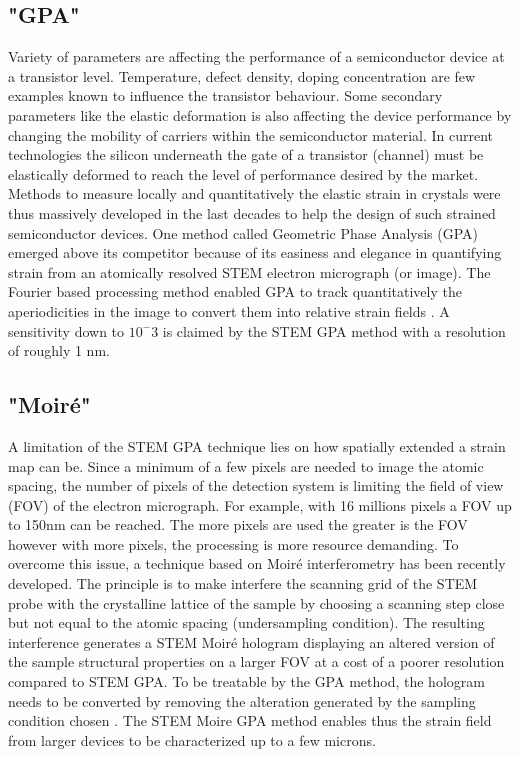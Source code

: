 \documentclass{article}
\begin{document}
\subsection{"GPA"}
Variety of parameters are affecting the performance of a semiconductor device at 
a transistor level. Temperature, defect density, doping concentration are few 
examples known to influence the transistor behaviour. Some secondary parameters 
like the elastic deformation is also affecting the device performance by 
changing the mobility of carriers within the semiconductor material. In current 
technologies the silicon underneath the gate of a transistor (channel) must be 
elastically deformed to reach the level of performance desired by the market. 
Methods to measure locally and quantitatively the elastic strain in crystals 
were thus massively developed in the last decades to help the design of 
such strained semiconductor devices. One method called Geometric Phase Analysis 
(GPA) emerged above its competitor because of its easiness and elegance in 
quantifying strain from an atomically resolved STEM electron micrograph (or 
image). The Fourier based processing method enabled GPA to track quantitatively 
the aperiodicities in the image to convert them into relative strain fields 
\cite{Hytch1998}. A sensitivity down to $10^-{3}$ is claimed by the STEM GPA 
method with a resolution of roughly 1 nm.
\subsection{"Moir{\'e}"}
A limitation of the STEM GPA technique lies on how spatially extended a strain 
map can be. Since a minimum of a few pixels are needed to image the atomic 
spacing, the number of pixels of the detection system is limiting the field of 
view (FOV) of the electron micrograph. For example, with 16 millions pixels a 
FOV up to 150nm can be reached. The more pixels are used the greater is the FOV 
however with more pixels, the processing is more resource demanding. To overcome 
this issue, a technique based on Moir{\'e} interferometry has been recently 
developed. The principle is to make interfere the scanning grid of the STEM 
probe with the crystalline lattice of the sample by choosing a scanning step 
close but not equal to the atomic spacing (undersampling condition). The 
resulting interference generates a STEM Moir{\'e }hologram displaying an altered 
version of the sample structural properties on a larger FOV at a cost of a 
poorer resolution compared to STEM GPA. To be treatable by the GPA 
method, the hologram needs to be converted by removing the alteration generated 
by the sampling condition chosen \cite{Pofelski2017}. The STEM Moire GPA method 
enables thus the strain field from larger devices to be characterized up to a 
few microns.
\end{document}
